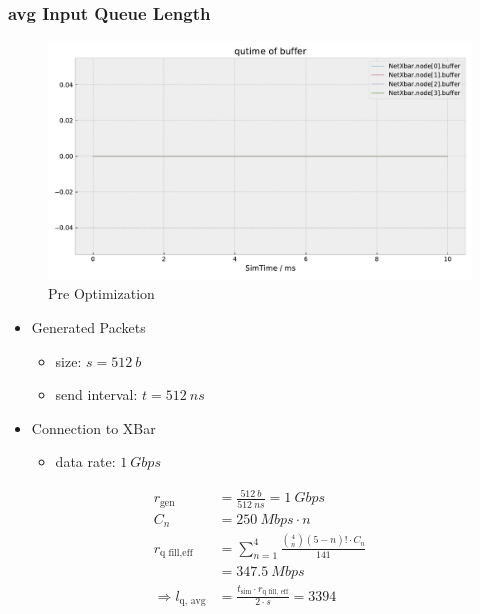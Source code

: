 \documentclass[]{scrartcl}
\begin{document}
    \subsubsection{avg Input Queue Length}
        \begin{figure}[H]
            \centering
            \includegraphics[width=\columnwidth, page=2]{../../python/results/preopt-General-0}
            \caption{Pre Optimization}%
            \label{fig:}
        \end{figure}

        \begin{itemize}
            \item Generated Packets
                \begin{itemize}
                    \item size: $ s = \SI{512}{b}$
                    \item send interval: $ t = \SI{512}{ns}$
                \end{itemize}
            \item Connection to XBar
                \begin{itemize}
                    \item data rate: $\SI{1}{Gbps}$
                \end{itemize}
        \end{itemize}

        \begin{align}
            r_\text{gen} &= \frac{\SI{512}{b}}{\SI{512}{ns}} = \SI{1}{Gbps}\\
            C_n &= \SI{250}{Mbps}\cdot n\\
            r_\text{q fill,eff} &= \sum_{n=1}^4 \frac{\binom{4}{n}\left( 5-n \right)! \cdot C_n }{141}\\
                                &= \SI{347.5}{Mbps}\\
            \Rightarrow l_\text{q, avg} &= \frac{t_\text{sim}\cdot r_\text{q fill, eff}}{2\cdot s} = 3394
        \end{align}
\end{document}
